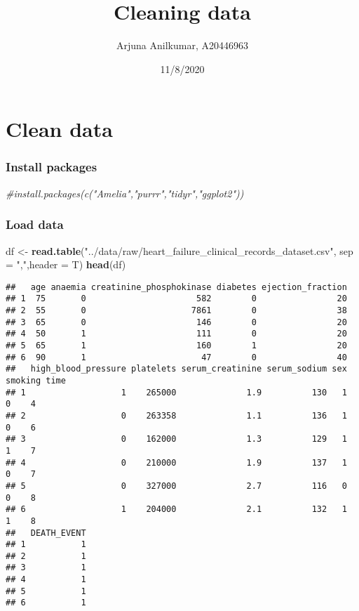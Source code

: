 \documentclass[
]{article}
\title{Cleaning data}
\author{Arjuna Anilkumar, A20446963}
\date{11/8/2020}
\newenvironment{Shaded}{\begin{snugshade}}{\end{snugshade}}
\newcommand{\CommentTok}[1]{\textcolor[rgb]{0.56,0.35,0.01}{\textit{#1}}}
\newcommand{\DataTypeTok}[1]{\textcolor[rgb]{0.13,0.29,0.53}{#1}}
\newcommand{\KeywordTok}[1]{\textcolor[rgb]{0.13,0.29,0.53}{\textbf{#1}}}
\newcommand{\NormalTok}[1]{#1}
\newcommand{\StringTok}[1]{\textcolor[rgb]{0.31,0.60,0.02}{#1}}
\begin{document}
\maketitle

\hypertarget{clean-data}{%
\section{Clean data}\label{clean-data}}

\hypertarget{install-packages}{%
\subsubsection{Install packages}\label{install-packages}}

\begin{Shaded}
\begin{Highlighting}[]
\CommentTok{#install.packages(c("Amelia","purrr","tidyr","ggplot2"))}
\end{Highlighting}
\end{Shaded}

\hypertarget{load-data}{%
\subsubsection{Load data}\label{load-data}}

\begin{Shaded}
\begin{Highlighting}[]
\NormalTok{df <-}\StringTok{ }\KeywordTok{read.table}\NormalTok{(}\StringTok{"../data/raw/heart_failure_clinical_records_dataset.csv"}\NormalTok{, }\DataTypeTok{sep =} \StringTok{","}\NormalTok{,}\DataTypeTok{header =}\NormalTok{ T)}
\KeywordTok{head}\NormalTok{(df)}
\end{Highlighting}
\end{Shaded}

\begin{verbatim}
##   age anaemia creatinine_phosphokinase diabetes ejection_fraction
## 1  75       0                      582        0                20
## 2  55       0                     7861        0                38
## 3  65       0                      146        0                20
## 4  50       1                      111        0                20
## 5  65       1                      160        1                20
## 6  90       1                       47        0                40
##   high_blood_pressure platelets serum_creatinine serum_sodium sex smoking time
## 1                   1    265000              1.9          130   1       0    4
## 2                   0    263358              1.1          136   1       0    6
## 3                   0    162000              1.3          129   1       1    7
## 4                   0    210000              1.9          137   1       0    7
## 5                   0    327000              2.7          116   0       0    8
## 6                   1    204000              2.1          132   1       1    8
##   DEATH_EVENT
## 1           1
## 2           1
## 3           1
## 4           1
## 5           1
## 6           1
\end{verbatim}
\end{document}
